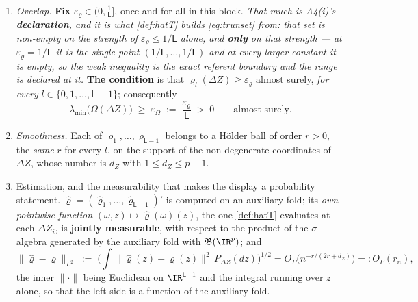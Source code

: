 \begin{assumption}\label{ass:overlap}~
\begin{enumerate}
\item[(i)] \emph{Overlap.} \textbf{Fix} $\varepsilon_\varrho\in\big(0,\tfrac1{\mathsf L}\big]$, once and
for all in this block. \emph{That much is A4(i)'s \textbf{declaration}, and it is what \cref{def:hatT}
builds \eqref{eq:trunset} from: that set is non-empty on the strength of
$\varepsilon_\varrho\le1/\mathsf L$ alone, and \textbf{only} on that strength --- at
$\varepsilon_\varrho=1/\mathsf L$ it is the single point $(1/\mathsf L,\dots,1/\mathsf L)$ and at every
larger constant it is empty, so the weak inequality is the exact referent boundary and the range is
declared at it.} \textbf{The condition} is that
$\varrho_l(\Delta Z)\ge\varepsilon_\varrho$ almost surely, \emph{for every}
$l\in\{0,1,\dots,\mathsf L-1\}$; consequently
\begin{equation}\label{eq:omegafloor}
\lambda_{\min}\big(\Omega(\Delta Z)\big)\;\ge\;\varepsilon_\Omega\;:=\;\frac{\varepsilon_\varrho}{\mathsf L}\;>\;0
\qquad\text{almost surely.}
\end{equation}
\item[(ii)] \emph{Smoothness.} Each of $\varrho_1,\dots,\varrho_{\mathsf L-1}$ belongs to a H\"older ball
of order $r>0$, the \emph{same} $r$ for every $l$, on the support of the
non-degenerate coordinates of $\Delta Z$, whose number is $d_Z$ with $1\le d_Z\le p-1$.
\item[(iii)] Estimation, and the measurability that makes the display a probability statement.
$\hat\varrho=(\hat\varrho_1,\dots,\hat\varrho_{\mathsf L-1})'$ is computed on an auxiliary fold; its
\emph{own pointwise function}
$(\omega,z)\mapsto\hat\varrho(\omega)(z)$, the one \cref{def:hatT} evaluates at each $\Delta Z_i$, is
\textbf{jointly measurable}, with respect to the product of the $\sigma$-algebra generated by the
auxiliary fold with $\mathfrak B(\IR^{p})$; and
\[
\big\|\hat\varrho-\varrho\big\|_{L^2}
\;:=\;\Big(\int\big\|\hat\varrho(z)-\varrho(z)\big\|^{2}\,P_{\Delta Z}(dz)\Big)^{1/2}
=O_P\big(n^{-r/(2r+d_Z)}\big)=:O_P(r_n),
\]
the inner $\|\cdot\|$ being Euclidean on $\IR^{\mathsf L-1}$ and the integral running over $z$ alone, so
that the left side is a function of the auxiliary fold.
\end{enumerate}
\end{assumption}


